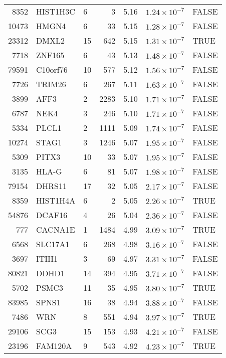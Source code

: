 \begin{table}[ht]
\begin{adjustbox}{totalheight=10in}
\begin{tabular}{rllrrrl}
  8352 & HIST1H3C & 6 &   3 & 5.16 & $1.24 \times 10^{-7}$ & FALSE \\ 
  10473 & HMGN4 & 6 &  33 & 5.15 & $1.28 \times 10^{-7}$ & FALSE \\ 
  23312 & DMXL2 & 15 & 642 & 5.15 & $1.31 \times 10^{-7}$ & TRUE \\ 
  7718 & ZNF165 & 6 &  43 & 5.13 & $1.48 \times 10^{-7}$ & FALSE \\ 
  79591 & C10orf76 & 10 & 577 & 5.12 & $1.56 \times 10^{-7}$ & FALSE \\ 
  7726 & TRIM26 & 6 & 267 & 5.11 & $1.63 \times 10^{-7}$ & FALSE \\ 
  3899 & AFF3 & 2 & 2283 & 5.10 & $1.71 \times 10^{-7}$ & FALSE \\ 
  6787 & NEK4 & 3 & 246 & 5.10 & $1.71 \times 10^{-7}$ & FALSE \\ 
  5334 & PLCL1 & 2 & 1111 & 5.09 & $1.74 \times 10^{-7}$ & FALSE \\ 
  10274 & STAG1 & 3 & 1246 & 5.07 & $1.95 \times 10^{-7}$ & FALSE \\ 
  5309 & PITX3 & 10 &  33 & 5.07 & $1.95 \times 10^{-7}$ & FALSE \\ 
  3135 & HLA-G & 6 &  81 & 5.07 & $1.98 \times 10^{-7}$ & FALSE \\ 
  79154 & DHRS11 & 17 &  32 & 5.05 & $2.17 \times 10^{-7}$ & FALSE \\ 
  8359 & HIST1H4A & 6 &   2 & 5.05 & $2.26 \times 10^{-7}$ & TRUE \\ 
  54876 & DCAF16 & 4 &  26 & 5.04 & $2.36 \times 10^{-7}$ & FALSE \\ 
  777 & CACNA1E & 1 & 1484 & 4.99 & $3.09 \times 10^{-7}$ & TRUE \\ 
  6568 & SLC17A1 & 6 & 268 & 4.98 & $3.16 \times 10^{-7}$ & FALSE \\ 
  3697 & ITIH1 & 3 &  69 & 4.97 & $3.31 \times 10^{-7}$ & FALSE \\ 
  80821 & DDHD1 & 14 & 394 & 4.95 & $3.71 \times 10^{-7}$ & FALSE \\ 
  5702 & PSMC3 & 11 &  35 & 4.95 & $3.80 \times 10^{-7}$ & TRUE \\ 
  83985 & SPNS1 & 16 &  38 & 4.94 & $3.88 \times 10^{-7}$ & FALSE \\ 
  7486 & WRN & 8 & 551 & 4.94 & $3.97 \times 10^{-7}$ & TRUE \\ 
  29106 & SCG3 & 15 & 153 & 4.93 & $4.21 \times 10^{-7}$ & FALSE \\ 
  23196 & FAM120A & 9 & 543 & 4.92 & $4.23 \times 10^{-7}$ & TRUE \\ 

\end{tabular}
\end{adjustbox}
\end{table}
